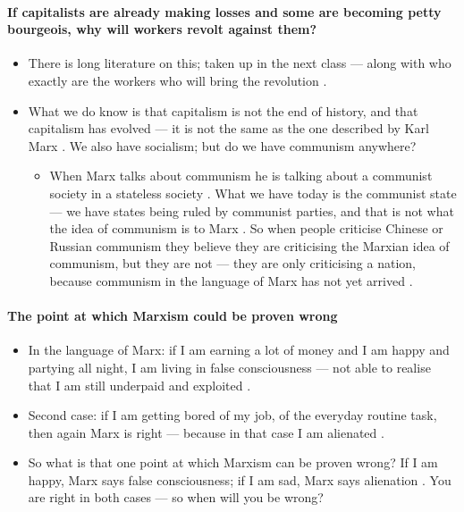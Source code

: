 \paragraph{If capitalists are already making losses and some are becoming petty bourgeois, why will workers revolt against them?}
\begin{itemize}
    \item There is long literature on this; taken up in the next class --- along with who exactly are the workers who will bring the revolution .
    \item What we do know is that capitalism is not the end of history, and that capitalism has evolved --- it is not the same as the one described by Karl Marx . We also have socialism; but do we have communism anywhere? 
    \begin{itemize}
        \item When Marx talks about communism he is talking about a communist society in a stateless society . What we have today is the communist state --- we have states being ruled by communist parties, and that is not what the idea of communism is to Marx . So when people criticise Chinese or Russian communism they believe they are criticising the Marxian idea of communism, but they are not --- they are only criticising a nation, because communism in the language of Marx has not yet arrived .
    \end{itemize}
\end{itemize}

\paragraph{The point at which Marxism could be proven wrong}
\begin{itemize}
    \item In the language of Marx: if I am earning a lot of money and I am happy and partying all night, I am living in false consciousness --- not able to realise that I am still underpaid and exploited .
    \item Second case: if I am getting bored of my job, of the everyday routine task, then again Marx is right --- because in that case I am alienated .
    \item So what is that one point at which Marxism can be proven wrong? If I am happy, Marx says false consciousness; if I am sad, Marx says alienation . You are right in both cases --- so when will you be wrong? 
\end{itemize}

